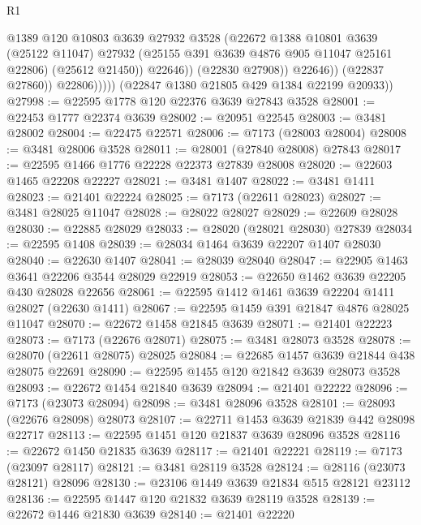 \begin{lexlean}{R1}
\begin{coremodule}
                            @1389
                            @120
                            @10803
                            @3639
                            @27932
                            @3528
                            (@22672
                              @1388
                              @10801
                              @3639
                              (@25122 @11047)
                              @27932
                              (@25155 @391 @3639 @4876 @905 @11047 @25161 @22806)
                              (@25612 @21450))
                            @22646))
                        (@22830 @27908))
                      @22646))
                  (@22837 @27860))
                @22806)))))
      (@22847 @1380 @21805 @429 @1384 @22199 @20933))
@27998 := @22595 @1778 @120 @22376 @3639 @27843 @3528
@28001 := @22453 @1777 @22374 @3639
@28002 := @20951 @22545
@28003 := @3481 @28002
@28004 := @22475 @22571
@28006 := @7173 (@28003 @28004)
@28008 := @3481 @28006 @3528
@28011 := @28001 (@27840 @28008) @27843
@28017 := @22595 @1466 @1776 @22228 @22373 @27839 @28008
@28020 := @22603 @1465 @22208 @22227
@28021 := @3481 @1407
@28022 := @3481 @1411
@28023 := @21401 @22224
@28025 := @7173 (@22611 @28023)
@28027 := @3481 @28025 @11047
@28028 := @28022 @28027
@28029 := @22609 @28028
@28030 := @22885 @28029
@28033 := @28020 (@28021 @28030) @27839
@28034 := @22595 @1408
@28039 := @28034 @1464 @3639 @22207 @1407 @28030
@28040 := @22630 @1407
@28041 := @28039 @28040
@28047 := @22905 @1463 @3641 @22206 @3544 @28029 @22919
@28053 := @22650 @1462 @3639 @22205 @430 @28028 @22656
@28061 := @22595 @1412 @1461 @3639 @22204 @1411 @28027 (@22630 @1411)
@28067 := @22595 @1459 @391 @21847 @4876 @28025 @11047
@28070 := @22672 @1458 @21845 @3639
@28071 := @21401 @22223
@28073 := @7173 (@22676 @28071)
@28075 := @3481 @28073 @3528
@28078 := @28070 (@22611 @28075) @28025
@28084 := @22685 @1457 @3639 @21844 @438 @28075 @22691
@28090 := @22595 @1455 @120 @21842 @3639 @28073 @3528
@28093 := @22672 @1454 @21840 @3639
@28094 := @21401 @22222
@28096 := @7173 (@23073 @28094)
@28098 := @3481 @28096 @3528
@28101 := @28093 (@22676 @28098) @28073
@28107 := @22711 @1453 @3639 @21839 @442 @28098 @22717
@28113 := @22595 @1451 @120 @21837 @3639 @28096 @3528
@28116 := @22672 @1450 @21835 @3639
@28117 := @21401 @22221
@28119 := @7173 (@23097 @28117)
@28121 := @3481 @28119 @3528
@28124 := @28116 (@23073 @28121) @28096
@28130 := @23106 @1449 @3639 @21834 @515 @28121 @23112
@28136 := @22595 @1447 @120 @21832 @3639 @28119 @3528
@28139 := @22672 @1446 @21830 @3639
@28140 := @21401 @22220

\end{coremodule}
\end{lexlean}
